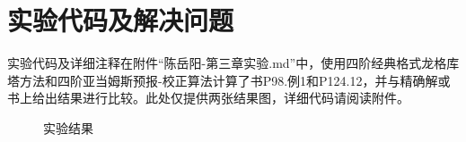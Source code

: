 \documentclass{article}
\begin{document}
\section{实验代码及解决问题}
实验代码及详细注释在附件“陈岳阳-第三章实验.md”中，使用四阶经典格式龙格库塔方法和四阶亚当姆斯预报-校正算法计算了书P98.例1和P124.12，并与精确解或书上给出结果进行比较。此处仅提供两张结果图，详细代码请阅读附件。
\begin{figure}
	\centering
	\caption{实验结果}
\end{figure}
\end{document}
